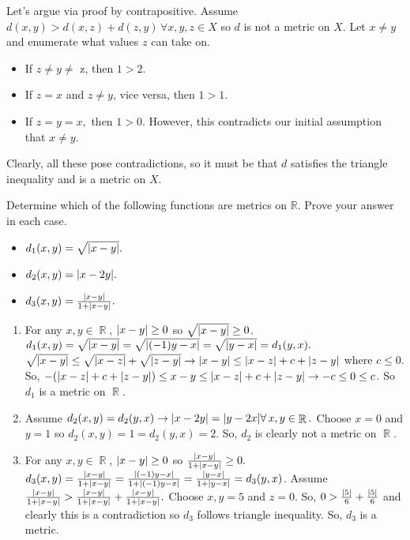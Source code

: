 \documentclass[12pt,letterpaper,boxed]{hmcpset}
\DeclarePairedDelimiter\abs{\lvert}{\rvert}
\DeclareMathOperator{\R}{\mathbb{R}}
\begin{document}
\begin{solution}
Let's argue via proof by contrapositive. Assume $d(x, y) > d(x, z) + d(z, y) \, \forall x, y, z \in X$ so $d$ is not a metric on $X.$ Let $x \neq y$ and enumerate what values $z$ can take on. 
\vspace{-2mm}
\begin{itemize}
	\itemsep0em
	\item If $z \neq y \neq$ z, then $1 > 2.$
	\item If $z = x$ and $z \neq y$, vice versa, then $1 > 1.$
	\item If $z = y = x,$ then $1 > 0.$ However, this contradicts our initial assumption that $x \neq y.$
\end{itemize}
Clearly, all these pose contradictions, so it must be that $d$ satisfies the triangle inequality and is a metric on $X$.

\end{solution}

\begin{problem}[Exercise 2.4.]
Determine which of the following functions are metrics on $\mathbb{R}$. Prove your answer in each case.
\vspace{-2mm}
\begin{itemize}
	\itemsep0em
	\item $d_1(x,y)=\sqrt{\abs{x - y}}.$
	\item $d_2(x,y)=\abs{x - 2y}.$
	\item $d_3(x,y)=\frac{\abs{x - y}}{1 + \abs{x - y}}.$
\end{itemize}
\end{problem}
\begin{solution}
\vspace{-2mm}
\begin{enumerate}
	\itemsep0em
	\item For any $x,y \in \R$, $\abs{x - y}\ge 0$ so $\sqrt{\abs{x - y}}\ge 0$. $d_1(x,y)= \sqrt{\abs{x - y}}= \sqrt{\abs{(-1)y -x}} = \sqrt{\abs{y -x}}=d_1(y,x).$ $\sqrt{\abs{x - y}} \leq \sqrt{\abs{x - z}} + \sqrt{\abs{z - y}} \rightarrow \abs{x - y} \leq \abs{x-z} + c + \abs{z - y}$ where $c \leq 0$. So, $-(\abs{x-z} + c + \abs{z - y}) \leq x - y \leq \abs{x-z} + c + \abs{z - y} \rightarrow -c \leq 0 \leq c$. So $d_1$ is a metric on $\R.$ 
	\item Assume $d_2(x,y)=d_2(y,x)\rightarrow \abs{x - 2y} = \abs{y - 2x} \forall \, x, y \in \R.$ Choose $x=0$ and $y=1$ so $d_2(x,y)=1=d_2(y,x)=2$. So, $d_2$ is clearly not a metric on $\R.$
	\item For any $x,y \in \R$, $\abs{x - y}\ge 0$ so $\frac{\abs{x - y}}{1 + \abs{x - y}} \ge 0.$ $d_3(x,y)= \frac{\abs{x - y}}{1 + \abs{x - y}}= \frac{\abs{(-1)y -x}}{1 + \abs{(-1)y -x}} = \frac{\abs{y -x}}{1 + \abs{y -x}} =d_3(y,x)$. Assume $\frac{\abs{x - y}}{1 + \abs{x - y}} > \frac{\abs{x - y}}{1 + \abs{x - y}} + \frac{\abs{x - y}}{1 + \abs{x - y}}.$ Choose $x, y = 5$ and $z = 0$. So, $0 > \frac{\abs{5}}{6} + \frac{\abs{5}}{6}$ and clearly this is a contradiction so $d_3$ follows triangle inequality. So, $d_3$ is a metric.
\end{enumerate}
\end{solution}
\end{document}
